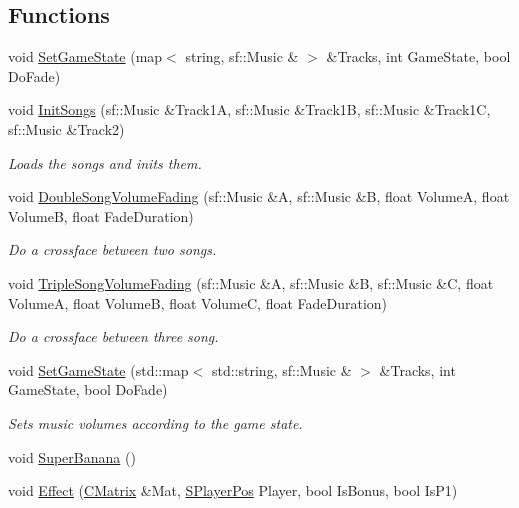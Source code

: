 \subsection*{Functions}
\begin{DoxyCompactItemize}
\item 
void \hyperlink{namespace_chase_game_af423e47c7318b7eeb67ff1f1a6b1547d}{Set\-Game\-State} (map$<$ string, sf\-::\-Music \& $>$ \&Tracks, int Game\-State, bool Do\-Fade)
\item 
void \hyperlink{namespace_chase_game_af1b7d4727ff31281f8efdf46175e94c3}{Init\-Songs} (sf\-::\-Music \&Track1\-A, sf\-::\-Music \&Track1\-B, sf\-::\-Music \&Track1\-C, sf\-::\-Music \&Track2)
\begin{DoxyCompactList}\small\item\em Loads the songs and inits them. \end{DoxyCompactList}\item 
void \hyperlink{namespace_chase_game_a1fafa6862bb2df06c93d286361fefaa4}{Double\-Song\-Volume\-Fading} (sf\-::\-Music \&A, sf\-::\-Music \&B, float Volume\-A, float Volume\-B, float Fade\-Duration)
\begin{DoxyCompactList}\small\item\em Do a crossface between two songs. \end{DoxyCompactList}\item 
void \hyperlink{namespace_chase_game_a3b9e1d486d981f5332d23142eb4777b7}{Triple\-Song\-Volume\-Fading} (sf\-::\-Music \&A, sf\-::\-Music \&B, sf\-::\-Music \&C, float Volume\-A, float Volume\-B, float Volume\-C, float Fade\-Duration)
\begin{DoxyCompactList}\small\item\em Do a crossface between three song. \end{DoxyCompactList}\item 
void \hyperlink{namespace_chase_game_ac628bcb1f9de7ece2d9705ea5c6e9e91}{Set\-Game\-State} (std\-::map$<$ std\-::string, sf\-::\-Music \& $>$ \&Tracks, int Game\-State, bool Do\-Fade)
\begin{DoxyCompactList}\small\item\em Sets music volumes according to the game state. \end{DoxyCompactList}\item 
void \hyperlink{namespace_chase_game_a19b95183bbaf6684ffc6511a4f9922f5}{Super\-Banana} ()
\item 
void \hyperlink{namespace_chase_game_ab2f720c0666cf49dd6ce958a0bb94e7e}{Effect} (\hyperlink{namespace_chase_game_a469449f9237e59efce3982127366c550}{C\-Matrix} \&Mat, \hyperlink{struct_chase_game_1_1_s_player_pos}{S\-Player\-Pos} Player, bool Is\-Bonus, bool Is\-P1)

\end{DoxyCompactItemize}
